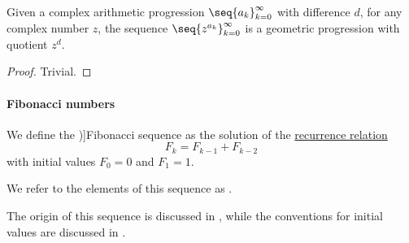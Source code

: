 \begin{proposition}\label{thm:arithmetic_to_geometric_progression}
  Given a complex arithmetic progression \( \seq{ a_k }_{k=0}^\infty \) with difference \( d \), for any complex number \( z \), the sequence \( \seq{ z^{a_k} }_{k=0}^\infty \) is a geometric progression with quotient \( z^d \).
\end{proposition}
\begin{proof}
  Trivial.
\end{proof}

\paragraph{Fibonacci numbers}

\begin{definition}\label{def:fibonacci_number}
  We define the \term[ru=числа Фибоначчи (\cite[\S 5.7.3]{Новиков2013ДискретнаяМатематика})]{Fibonacci sequence} as the solution of the \hyperref[def:recurrence_relation]{recurrence relation}
  \begin{equation}\label{eq:def:fibonacci_number}
    F_k = F_{k-1} + F_{k-2}
  \end{equation}
  with initial values \( F_0 = 0 \) and \( F_1 = 1 \).

  We refer to the elements of this sequence as .
\end{definition}
\begin{comments}
  \item The origin of this sequence is discussed in , while the conventions for initial values are discussed in .
\end{comments}

